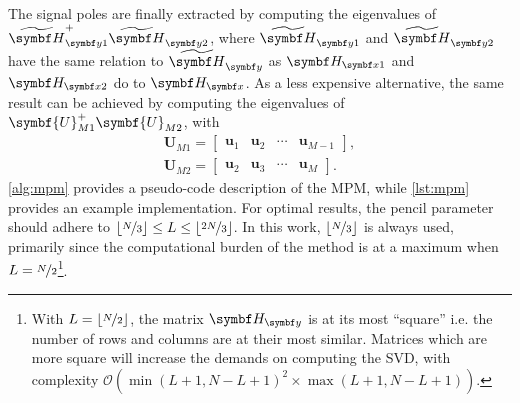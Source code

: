 The signal poles are finally extracted by computing the eigenvalues of
$\Hytildeone^+ \Hytildetwo^{\vphantom{+}}$, where
$\Hytildeone$ and $\Hytildetwo$ have the same relation to $\Hytilde$ as
$\Hxone$ and  $\Hxtwo$ do to  $\Hx$. As a less expensive alternative, the same
result can be achieved by computing the eigenvalues of
$\symbf{U}_{M1}^+\symbf{U}_{M2}^{\vphantom{+}}$, with
\begin{subequations}
    \begin{gather}
        \symbf{U}_{M1} =
        \begin{bmatrix}
            \symbf{u}_1 & \symbf{u}_2 & \cdots & \symbf{u}_{M-1}
        \end{bmatrix},\\
        \symbf{U}_{M2} =
        \begin{bmatrix}
            \symbf{u}_2 & \symbf{u}_3 & \cdots & \symbf{u}_{M}
        \end{bmatrix}.
    \end{gather}
\end{subequations}
\cref{alg:mpm} provides a pseudo-code description of the \ac{MPM}, while
\cref{lst:mpm} provides an example \Python implementation. For optimal
results, the pencil parameter should adhere to $\lfloor \nicefrac{N}{3} \rfloor
\leq L \leq \lfloor\nicefrac{2N}{3}\rfloor$\cite{Hua1990}. In this work,
$\lfloor\nicefrac{N}{3}\rfloor$ is always used, primarily since the computational
burden of the method is at a maximum when $L = \nicefrac{N}{2}$\footnote{
    With $L = \lfloor\nicefrac{N}{2}\rfloor$, the matrix
    $\Hy$ is at its most ``square'' i.e. the number of rows
    and columns are at their most similar. Matrices which are more
    square will increase the demands on computing the \ac{SVD}, with
    complexity $\mathcal{O}(\min(L+1,N-L+1)^2 \times \max(L+1,N-L+1))$.
}.


